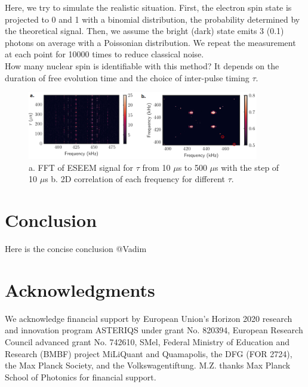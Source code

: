 \documentclass[%
 reprint,
superscriptaddress,
 amsmath,amssymb,
 aps,
]{revtex4-2}
\begin{document}
Here, we try to simulate the realistic situation. First, the electron spin state is projected to 0 and 1 with a binomial distribution, the probability determined by the theoretical signal. Then, we assume the bright (dark) state emits 3 (0.1) photons on average with a Poissonian distribution. We repeat the measurement at each point for 10000 times to reduce classical noise.\\
How many nuclear spin is identifiable with this method? It depends on the duration of free evolution time and the choice of inter-pulse timing $\tau$.

\begin{figure}%
	\begin{center}
		\includegraphics[width=0.9\textwidth]{pict/fig5.png}
		\caption{a. FFT of ESEEM signal for $\tau$ from 10 $\mu$s to 500 $\mu$s with the step of 10 $\mu$s b. 2D correlation of each frequency for different $\tau$.}
		\label{fig:5}
	\end{center}
\end{figure}

\section{Conclusion}
\label{sec:discussion}
Here is the concise conclusion @Vadim


\section*{Acknowledgments}
We acknowledge financial support by European Union's Horizon 2020 research and innovation program ASTERIQS under grant No. 820394, European Research Council advanced grant No. 742610, SMel, Federal Ministry of Education and Research (BMBF) project MiLiQuant and Quamapolis, the DFG (FOR 2724), the Max Planck Society, and the Volkswagentiftung. M.Z. thanks Max Planck School of Photonics for financial support.
\end{document}
